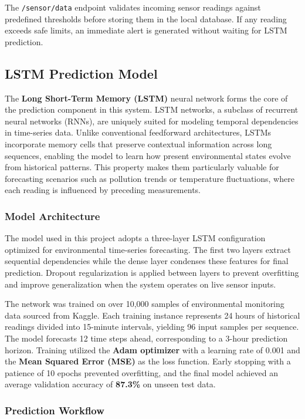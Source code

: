 The \texttt{/sensor/data} endpoint validates incoming sensor readings against predefined thresholds before storing them in the local database. If any reading exceeds safe limits, an immediate alert is generated without waiting for LSTM prediction.

\subsection{LSTM Prediction Model}

The \textbf{Long Short-Term Memory (LSTM)} neural network forms the core of the prediction component in this system. LSTM networks, a subclass of recurrent neural networks (RNNs), are uniquely suited for modeling temporal dependencies in time-series data. Unlike conventional feedforward architectures, LSTMs incorporate memory cells that preserve contextual information across long sequences, enabling the model to learn how present environmental states evolve from historical patterns. This property makes them particularly valuable for forecasting scenarios such as pollution trends or temperature fluctuations, where each reading is influenced by preceding measurements.

\subsubsection{Model Architecture}

The model used in this project adopts a three-layer LSTM configuration optimized for environmental time-series forecasting. The first two layers extract sequential dependencies while the dense layer condenses these features for final prediction. Dropout regularization is applied between layers to prevent overfitting and improve generalization when the system operates on live sensor inputs.


The network was trained on over 10,000 samples of environmental monitoring data sourced from Kaggle. Each training instance represents 24 hours of historical readings divided into 15-minute intervals, yielding 96 input samples per sequence. The model forecasts 12 time steps ahead, corresponding to a 3-hour prediction horizon. Training utilized the \textbf{Adam optimizer} with a learning rate of 0.001 and the \textbf{Mean Squared Error (MSE)} as the loss function. Early stopping with a patience of 10 epochs prevented overfitting, and the final model achieved an average validation accuracy of \textbf{87.3\%} on unseen test data.

\subsubsection{Prediction Workflow}

